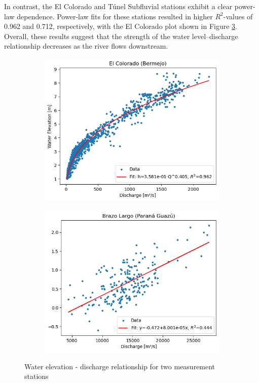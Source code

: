 In contrast, the El Colorado and Túnel Subfluvial stations exhibit a clear power-law dependence. Power-law fits for these stations resulted in higher $R^2$-values of 0.962 and 0.712, respectively, with the El Colorado plot shown in Figure \ref{fig:waterleveldischarge}. Overall, these results suggest that the strength of the water level–discharge relationship decreases as the river flows downstream.

\begin{figure}[h!]
    \centering
    \begin{subfigure}[b]{0.48\linewidth}
        \centering
        \includegraphics[width=\linewidth]{figures/ch5/wl discharge El Colorado.png}
        \label{fig:water level discharge Colorado}
    \end{subfigure}
    \hfill
    \begin{subfigure}[b]{0.48\linewidth}
        \centering
        \includegraphics[width=\linewidth]{figures/ch5/wl discharge Brazo Largo.png}
        \label{fig:water level discharge Brazo Largo}
    \end{subfigure}
    \caption{Water elevation - discharge relationship for two measurement stations}
    \label{fig:waterleveldischarge}
\end{figure}
